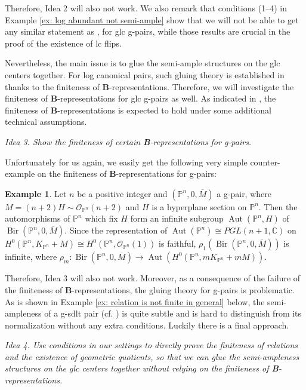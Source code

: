 \documentclass[11pt]{amsart}
\numberwithin{equation}{section}
\newcommand{\Bb}{{\bf{B}}}
\newcommand{\Cc}{\mathbb{C}}
\newcommand{\Pp}{\mathbb{P}}
\newcommand{\Bir}{\operatorname{Bir}}
\newcommand{\Aut}{\operatorname{Aut}}
\newcommand{\Oo}{\mathcal{O}}
\theoremstyle{definition}
\theoremstyle{definition}
\newtheorem{ex}[thm]{Example}
\theoremstyle{definition}
\begin{document}
Therefore, Idea 2 will also not work. We also remark that conditions (1--4) in Example \ref{ex: log abundant not semi-ample} show that we will not be able to get any similar statement as \cite[Theorem 1.7]{Bir12}, \cite[Corollary 1.5]{HX16} for glc g-pairs, while those results are crucial in the proof of the existence of lc flips.

Nevertheless, the main issue is to glue the semi-ample structures on the glc centers together. For log canonical pairs, such gluing theory is established in \cite{FG14,HX16} thanks to the finiteness of \Bb-representations. Therefore, we will investigate the finiteness of \Bb-representations for glc g-pairs as well. As indicated in \cite{Hu21}, the finiteness of \Bb-representations is expected to hold under some additional technical assumptions.

\smallskip

\noindent\textit{Idea 3. Show the finiteness of certain \Bb-representations for g-pairs.}

\smallskip

Unfortunately for us again, we easily get the following very simple counter-example on the finiteness of \textbf{B}-representations for g-pairs:

\begin{ex}\label{ex: fail finiteness b representation}
Let $n$ be a positive integer and $(\Pp^n,0,\overline{M})$ a g-pair, where $M=(n+2)H\sim\Oo_{\Pp^n}(n+2)$ and $H$ is a hyperplane section on $\mathbb P^n$. Then the automorphisms of $\Pp^n$ which fix $H$ form an infinite subgroup $\Aut(\Pp^n,H)$ of $\Bir(\Pp^n,0,\overline{M})$. Since the representation of $\Aut(\Pp^n)\cong PGL(n+1,\Cc)$ on $H^0(\Pp^n, K_{\Pp^n}+M)\cong H^0(\Pp^n,\Oo_{\Pp^n}(1))$ is faithful, $\rho_1(\Bir(\Pp^n,0,\overline{M}))$ is infinite, where $\rho_m: \Bir(\Pp^n,0,\overline{M})\to \Aut(H^0(\Pp^n,mK_{\Pp^n}+mM))$.
\end{ex}

Therefore, Idea 3 will also not work. Moreover, as a consequence of the failure of the finiteness of \textbf{B}-representations, the gluing theory for g-pairs is problematic. As is shown in Example \ref{ex: relation is not finite in general} below, the semi-ampleness of a g-sdlt pair (cf. \cite{Hu21}) is quite subtle and is hard to distinguish from its normalization without any extra conditions. Luckily there is a final approach.

\smallskip

\noindent\textit{Idea 4. Use conditions in our settings to directly prove the finiteness of relations and the existence of geometric quotients, so that we can glue the semi-ampleness structures on the glc centers together without relying on the finiteness of {\rm{\textbf{B}}}-representations.}
\end{document}
